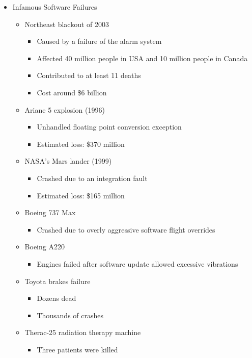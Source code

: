 \begin{itemize}
	\item Infamous Software Failures
	\begin{itemize}
		\item Northeast blackout of 2003
		\begin{itemize}
			\item Caused by a failure of the alarm system
			\item Affected 40 million people in USA and 10 million people in Canada
			\item Contributed to at least 11 deaths
			\item Cost around \$6 billion
		\end{itemize}
		\item Ariane 5 explosion (1996)
		\begin{itemize}
			\item Unhandled floating point conversion exception
			\item Estimated loss: \$370 million
		\end{itemize}
		\item NASA’s Mars lander (1999)
		\begin{itemize}
			\item Crashed due to an integration fault
			\item Estimated loss: \$165 million
		\end{itemize}
		\item Boeing 737 Max
		\begin{itemize}
			\item Crashed due to overly aggressive software flight overrides
		\end{itemize}
		\item Boeing A220
		\begin{itemize}
			\item Engines failed after software update allowed excessive vibrations
		\end{itemize}
		\item Toyota brakes failure
		\begin{itemize}
			\item Dozens dead
			\item Thousands of crashes
		\end{itemize}
		\item Therac-25 radiation therapy machine
		\begin{itemize}
			\item Three patients were killed
		\end{itemize}
	\end{itemize}


\end{itemize}
